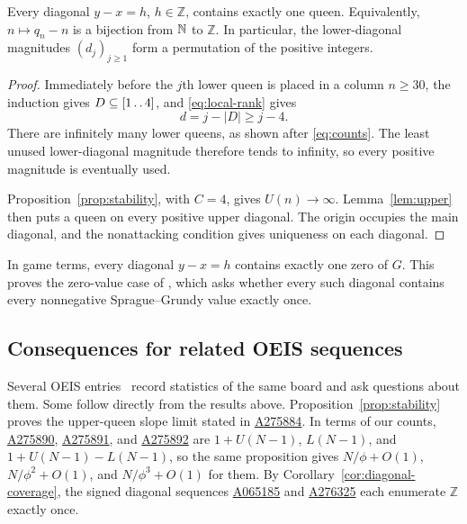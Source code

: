 \begin{corollary}\label{cor:diagonal-coverage}
Every diagonal $y-x=h$, $h\in\mathbb Z$, contains exactly one
queen. Equivalently, $n\mapsto q_n-n$ is a bijection from $\mathbb N$
to $\mathbb Z$. In particular, the lower-diagonal magnitudes
$(d_j)_{j\ge1}$ form a permutation of the positive integers.
\end{corollary}
\begin{proof}
Immediately before the $j$th lower queen is placed in a column
$n\ge30$, the induction gives $D\subseteq[1\mathinner{\ldotp\ldotp}4]$, and
\eqref{eq:local-rank} gives
\[
 d=j-|D|\ge j-4.
\]
There are infinitely many lower queens, as shown after
\eqref{eq:counts}. The least unused lower-diagonal magnitude
therefore tends to infinity, so every positive magnitude is
eventually used.

Proposition~\ref{prop:stability}, with $C=4$, gives
$U(n)\to\infty$. Lemma~\ref{lem:upper} then puts a queen on
every positive upper diagonal. The origin occupies the main
diagonal, and the nonattacking condition gives uniqueness on
each diagonal.
\end{proof}

\begin{remark}
In game terms, every diagonal $y-x=h$ contains exactly one
zero of $G$. This proves the zero-value case of
\cite[Conjecture~24]{DSS}, which asks whether every such diagonal
contains every nonnegative Sprague--Grundy value exactly once.
\end{remark}

\subsection{Consequences for related OEIS sequences}\label{sec:oeis-consequences}

Several OEIS entries~\cite{OEIS} record statistics of the same board
and ask questions about them. Some follow directly from the results
above. Proposition~\ref{prop:stability} proves the upper-queen slope
limit stated in \href{https://oeis.org/A275884}{A275884}. In terms of
our counts, \href{https://oeis.org/A275890}{A275890},
\href{https://oeis.org/A275891}{A275891}, and
\href{https://oeis.org/A275892}{A275892} are $1+U(N-1)$, $L(N-1)$, and
$1+U(N-1)-L(N-1)$, so the same proposition gives $N/\phi+O(1)$,
$N/\phi^2+O(1)$, and $N/\phi^3+O(1)$ for them. By
Corollary~\ref{cor:diagonal-coverage}, the signed diagonal sequences
\href{https://oeis.org/A065185}{A065185} and
\href{https://oeis.org/A276325}{A276325} each enumerate $\mathbb Z$
exactly once.


